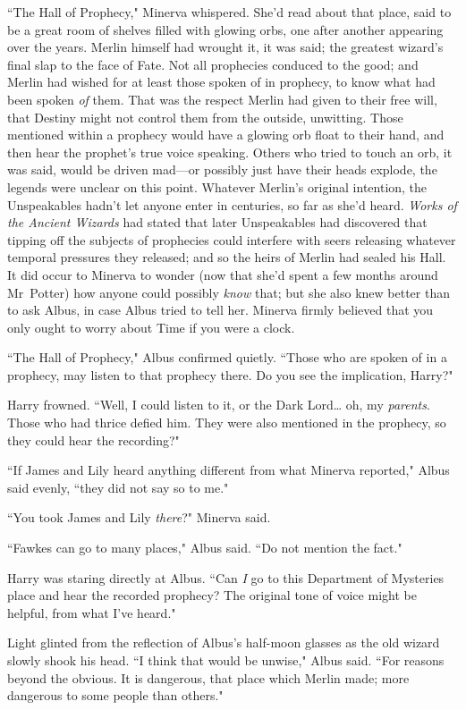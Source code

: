 ``The Hall of Prophecy," Minerva whispered. She'd read about that place, said to be a great room of shelves filled with glowing orbs, one after another appearing over the years. Merlin himself had wrought it, it was said; the greatest wizard's final slap to the face of Fate. Not all prophecies conduced to the good; and Merlin had wished for at least those spoken of in prophecy, to know what had been spoken \emph{of} them. That was the respect Merlin had given to their free will, that Destiny might not control them from the outside, unwitting. Those mentioned within a prophecy would have a glowing orb float to their hand, and then hear the prophet's true voice speaking. Others who tried to touch an orb, it was said, would be driven mad—or possibly just have their heads explode, the legends were unclear on this point. Whatever Merlin's original intention, the Unspeakables hadn't let anyone enter in centuries, so far as she'd heard. \emph{Works of the Ancient Wizards} had stated that later Unspeakables had discovered that tipping off the subjects of prophecies could interfere with seers releasing whatever temporal pressures they released; and so the heirs of Merlin had sealed his Hall. It did occur to Minerva to wonder (now that she'd spent a few months around Mr~Potter) how anyone could possibly \emph{know} that; but she also knew better than to ask Albus, in case Albus tried to tell her. Minerva firmly believed that you only ought to worry about Time if you were a clock.

``The Hall of Prophecy," Albus confirmed quietly. ``Those who are spoken of in a prophecy, may listen to that prophecy there. Do you see the implication, Harry?"

Harry frowned. ``Well, I could listen to it, or the Dark Lord{\ldots} oh, my \emph{parents}. Those who had thrice defied him. They were also mentioned in the prophecy, so they could hear the recording?"

``If James and Lily heard anything different from what Minerva reported," Albus said evenly, ``they did not say so to me."

``You took James and Lily \emph{there}?" Minerva said.

``Fawkes can go to many places," Albus said. ``Do not mention the fact."

Harry was staring directly at Albus. ``Can \emph{I} go to this Department of Mysteries place and hear the recorded prophecy? The original tone of voice might be helpful, from what I've heard."

Light glinted from the reflection of Albus's half-moon glasses as the old wizard slowly shook his head. ``I think that would be unwise," Albus said. ``For reasons beyond the obvious. It is dangerous, that place which Merlin made; more dangerous to some people than others."


